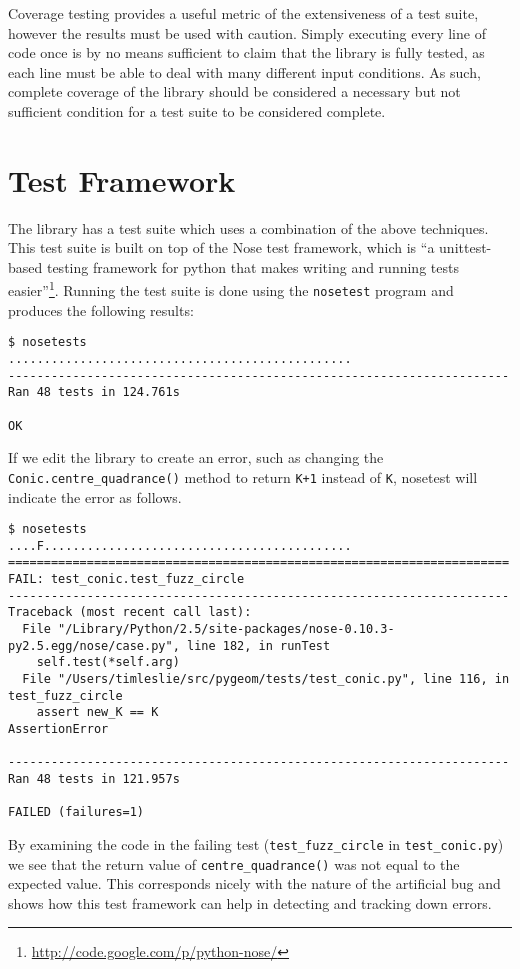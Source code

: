Coverage testing provides a useful metric of the extensiveness of a test suite, however the results must be used with caution.
Simply executing every line of code once is by no means sufficient to claim that the library is fully tested, as each line must be able to deal with many different input conditions.
As such, complete coverage of the library should be considered a necessary but not sufficient condition for a test suite to be considered complete.

\section{\pygeom Test Framework}

The \pygeom library has a test suite which uses a combination of the above techniques.
This test suite is built on top of the Nose test framework, which is ``a unittest-based testing framework for python that makes writing and running tests easier''\footnote{\url{http://code.google.com/p/python-nose/}}.
Running the test suite is done using the \texttt{nosetest} program and produces the following results:
\begin{verbatim}
$ nosetests
................................................
----------------------------------------------------------------------
Ran 48 tests in 124.761s

OK
\end{verbatim}
If we edit the library to create an error, such as changing the \texttt{Conic.centre\_quadrance()} method to return \texttt{K+1} instead of \texttt{K}, nosetest will indicate the error as follows.
\scriptsize
\begin{verbatim}
$ nosetests
....F...........................................
======================================================================
FAIL: test_conic.test_fuzz_circle
----------------------------------------------------------------------
Traceback (most recent call last):
  File "/Library/Python/2.5/site-packages/nose-0.10.3-py2.5.egg/nose/case.py", line 182, in runTest
    self.test(*self.arg)
  File "/Users/timleslie/src/pygeom/tests/test_conic.py", line 116, in test_fuzz_circle
    assert new_K == K
AssertionError

----------------------------------------------------------------------
Ran 48 tests in 121.957s

FAILED (failures=1)
\end{verbatim}
\normalsize
By examining the code in the failing test (\texttt{test\_fuzz\_circle} in \texttt{test\_conic.py}) we see that the return value of \texttt{centre\_quadrance()} was not equal to the expected value.
This corresponds nicely with the nature of the artificial bug and shows how this test framework can help in detecting and tracking down errors.

